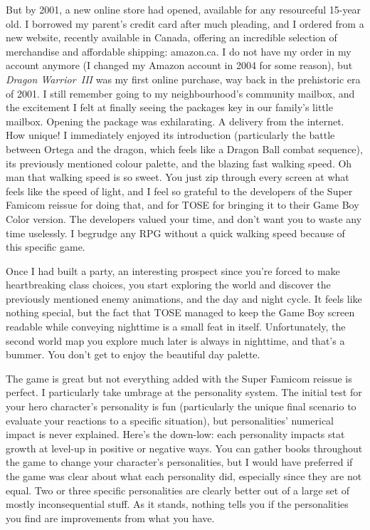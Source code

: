 \documentclass{book}
\begin{document}
But by 2001, a new online store had opened, available for any resourceful 15-year old. I borrowed my parent’s credit card after much pleading, and I ordered from a new website, recently available in Canada, offering an incredible selection of merchandise and affordable shipping: amazon.ca. I do not have my order in my account anymore (I changed my Amazon account in 2004 for some reason), but \emph{Dragon Warrior III} was my first online purchase, way back in the prehistoric era of 2001. I still remember going to my neighbourhood’s community mailbox, and the excitement I felt at finally seeing the packages key in our family’s little mailbox. Opening the package was exhilarating. A delivery from the internet. How unique! I immediately enjoyed its introduction (particularly the battle between Ortega and the dragon, which feels like a Dragon Ball combat sequence), its previously mentioned colour palette, and the blazing fast walking speed. Oh man that walking speed is so sweet. You just zip through every screen at what feels like the speed of light, and I feel so grateful to the developers of the Super Famicom reissue for doing that, and for TOSE for bringing it to their Game Boy Color version. The developers valued your time, and don’t want you to waste any time uselessly. I begrudge any RPG without a quick walking speed because of this specific game.

Once I had built a party, an interesting prospect since you’re forced to make heartbreaking class choices, you start exploring the world and discover the previously mentioned enemy animations, and the day and night cycle. It feels like nothing special, but the fact that TOSE managed to keep the Game Boy screen readable while conveying nighttime is a small feat in itself. Unfortunately, the second world map you explore much later is always in nighttime, and that’s a bummer. You don’t get to enjoy the beautiful day palette.

The game is great but not everything added with the Super Famicom reissue is perfect. I particularly take umbrage at the personality system. The initial test for your hero character’s personality is fun (particularly the unique final scenario to evaluate your reactions to a specific situation), but personalities’ numerical impact is never explained. Here’s the down-low: each personality impacts stat growth at level-up in positive or negative ways. You can gather books throughout the game to change your character’s personalities, but I would have preferred if the game was clear about what each personality did, especially since they are not equal. Two or three specific personalities are clearly better out of a large set of mostly inconsequential stuff. As it stands, nothing tells you if the personalities you find are improvements from what you have.
\end{document}
